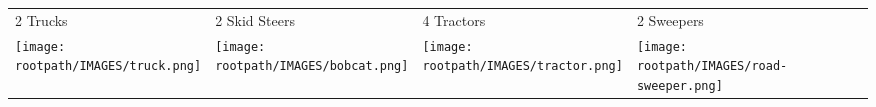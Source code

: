 \begin{tabular}{m{}m{}m{}m{}}
    {\color{ccorange} 2 Trucks} & {\color{ccorange} 2 Skid Steers} & {\color{ccorange} 4 Tractors} & {\color{ccorange} 2 Sweepers} \\
    \texttt{[image: \\rootpath/IMAGES/truck.png]}  & \texttt{[image: \\rootpath/IMAGES/bobcat.png]} & \texttt{[image: \\rootpath/IMAGES/tractor.png]} & \texttt{[image: \\rootpath/IMAGES/road-sweeper.png]}                         
    \end{tabular}